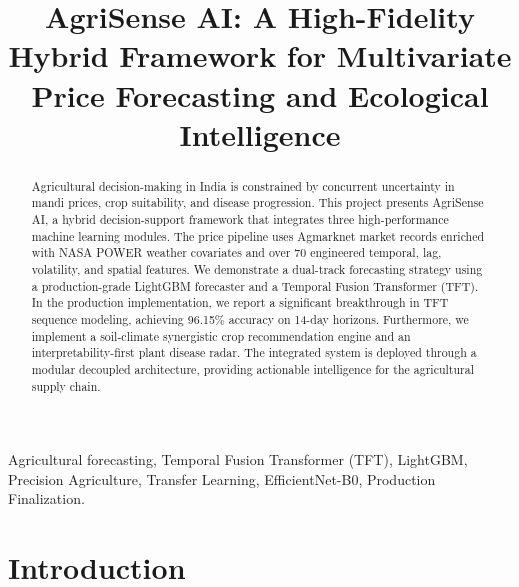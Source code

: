 \documentclass[conference]{IEEEtran}
\begin{document}
\title{AgriSense AI: A High-Fidelity Hybrid Framework for Multivariate Price Forecasting and Ecological Intelligence}

\author{
\and
{}
}

\maketitle

\begin{abstract}
Agricultural decision-making in India is constrained by concurrent uncertainty in mandi prices, crop suitability, and disease progression. This project presents AgriSense AI, a hybrid decision-support framework that integrates three high-performance machine learning modules. The price pipeline uses Agmarknet market records enriched with NASA POWER weather covariates and over 70 engineered temporal, lag, volatility, and spatial features. We demonstrate a dual-track forecasting strategy using a production-grade LightGBM forecaster and a Temporal Fusion Transformer (TFT). In the production implementation, we report a significant breakthrough in TFT sequence modeling, achieving 96.15\% accuracy on 14-day horizons. Furthermore, we implement a soil-climate synergistic crop recommendation engine and an interpretability-first plant disease radar. The integrated system is deployed through a modular decoupled architecture, providing actionable intelligence for the agricultural supply chain.
\end{abstract}

\begin{IEEEkeywords}
Agricultural forecasting, Temporal Fusion Transformer (TFT), LightGBM, Precision Agriculture, Transfer Learning, EfficientNet-B0, Production Finalization.
\end{IEEEkeywords}

\section{Introduction}
\end{document}

